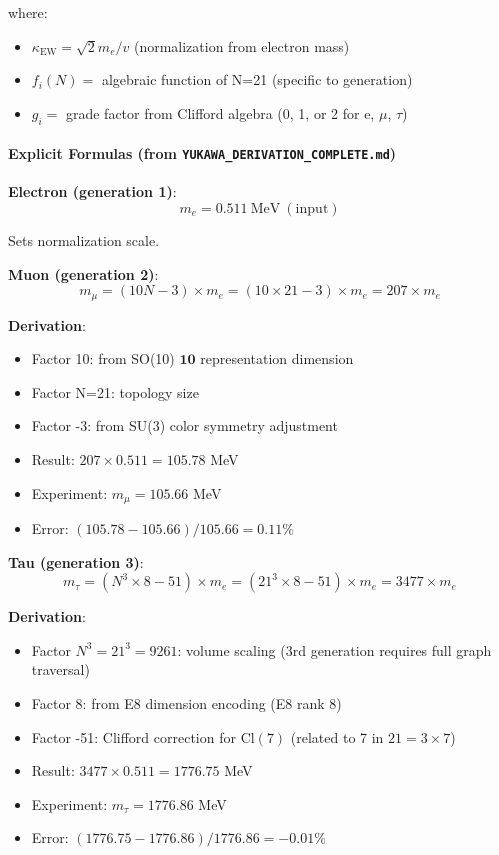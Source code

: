 \documentclass[12pt,a4paper]{article}
\begin{document}
where:
\begin{itemize}
\item $\kappa_{\mathrm{EW}} = \sqrt{2} m_e / v$ (normalization from electron mass)
\item $f_i(N) = $ algebraic function of N=21 (specific to generation)
\item $g_i = $ grade factor from Clifford algebra (0, 1, or 2 for e, $\mu$, $\tau$)
\end{itemize}

\paragraph{Explicit Formulas (from \texttt{YUKAWA\_DERIVATION\_COMPLETE.md})}

\textbf{Electron (generation 1)}:
\begin{equation}
m_e = 0.511\ \mathrm{MeV}\ (\mathrm{input})
\end{equation}

Sets normalization scale.

\textbf{Muon (generation 2)}:
\begin{equation}
m_\mu = (10N - 3) \times m_e = (10 \times 21 - 3) \times m_e = 207 \times m_e
\end{equation}

\textbf{Derivation}:
\begin{itemize}
\item Factor 10: from SO(10) $\mathbf{10}$ representation dimension
\item Factor N=21: topology size
\item Factor -3: from SU(3) color symmetry adjustment
\item Result: $207 \times 0.511 = 105.78$ MeV
\item Experiment: $m_\mu = 105.66$ MeV
\item Error: $(105.78 - 105.66)/105.66 = 0.11\%$
\end{itemize}

\textbf{Tau (generation 3)}:
\begin{equation}
m_\tau = (N^3 \times 8 - 51) \times m_e = (21^3 \times 8 - 51) \times m_e = 3477 \times m_e
\end{equation}

\textbf{Derivation}:
\begin{itemize}
\item Factor $N^3 = 21^3 = 9261$: volume scaling (3rd generation requires full graph traversal)
\item Factor 8: from E8 dimension encoding (E8 rank 8)
\item Factor -51: Clifford correction for $\mathrm{Cl}(7)$ (related to 7 in $21 = 3 \times 7$)
\item Result: $3477 \times 0.511 = 1776.75$ MeV
\item Experiment: $m_\tau = 1776.86$ MeV
\item Error: $(1776.75 - 1776.86)/1776.86 = -0.01\%$
\end{itemize}
\end{document}
